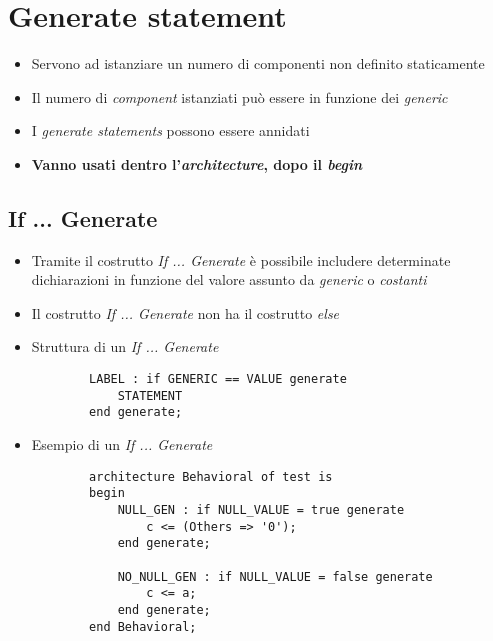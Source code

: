 \documentclass{article}
\begin{document}
\newpage

\section{Generate statement}
\begin{itemize}
  \item Servono ad istanziare un numero di componenti non definito staticamente
  \item Il numero di \textit{component} istanziati può essere in funzione dei \textit{generic}
  \item I \textit{generate statements} possono essere annidati
  \item \textbf{Vanno usati dentro l'\textit{architecture}, dopo il  \textit{begin}}
\end{itemize}
\subsection{If ... Generate}
\begin{itemize}
  \item Tramite il costrutto \textit{If ... Generate} è possibile includere determinate dichiarazioni in funzione del valore assunto da \textit{generic} o \textit{costanti}
  \item Il costrutto \textit{If ... Generate} non ha il costrutto \textit{else}
  \item Struttura di un \textit{If ... Generate}
        \begin{verbatim}
    	LABEL : if GENERIC == VALUE generate
        	STATEMENT
    	end generate;
    \end{verbatim}
  \item Esempio di un \textit{If ... Generate}
        \begin{verbatim}
	    architecture Behavioral of test is
        begin
            NULL_GEN : if NULL_VALUE = true generate
                c <= (Others => '0');
            end generate;

            NO_NULL_GEN : if NULL_VALUE = false generate
                c <= a;
            end generate;
        end Behavioral;
	      \end{verbatim}
\end{itemize}
\end{document}
